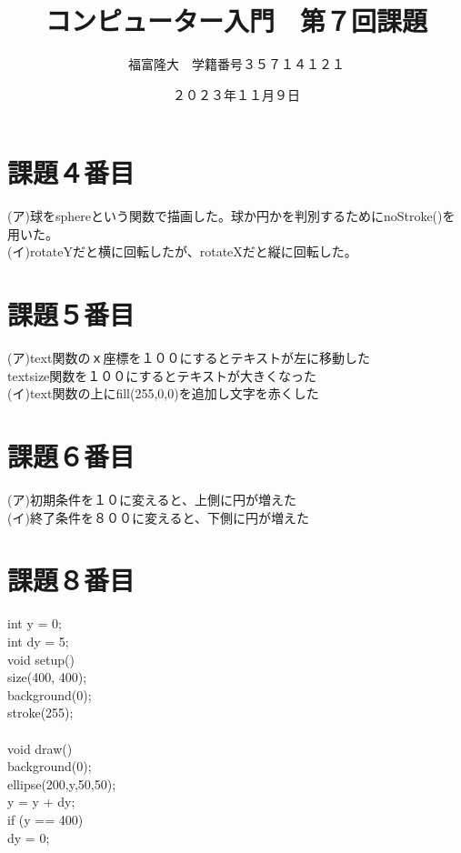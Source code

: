 \documentclass{jsarticle}
\title{コンピューター入門　第７回課題}
\author{福富隆大　学籍番号３５７１４１２１}
\date{２０２３年１１月９日}
\begin{document}
\maketitle 
\section{課題４番目}
(ア)球をsphereという関数で描画した。球か円かを判別するためにnoStroke()を用いた。\\
(イ)rotateYだと横に回転したが、rotateXだと縦に回転した。\\
\section{課題５番目}
(ア)text関数のｘ座標を１００にするとテキストが左に移動した\\
textsize関数を１００にするとテキストが大きくなった\\
(イ)text関数の上にfill(255,0,0)を追加し文字を赤くした
\section{課題６番目}
(ア)初期条件を１０に変えると、上側に円が増えた\\
(イ)終了条件を８００に変えると、下側に円が増えた\\
\section{課題８番目}
int y = 0;\\
int dy = 5;\\
void setup(){\\
size(400, 400);\\
background(0);\\
stroke(255);\\
}\\
void draw(){\\
background(0);\\
ellipse(200,y,50,50);\\
y = y + dy;\\
if (y == 400) {\\
dy = 0;\\
}\\
}
\end{document}
